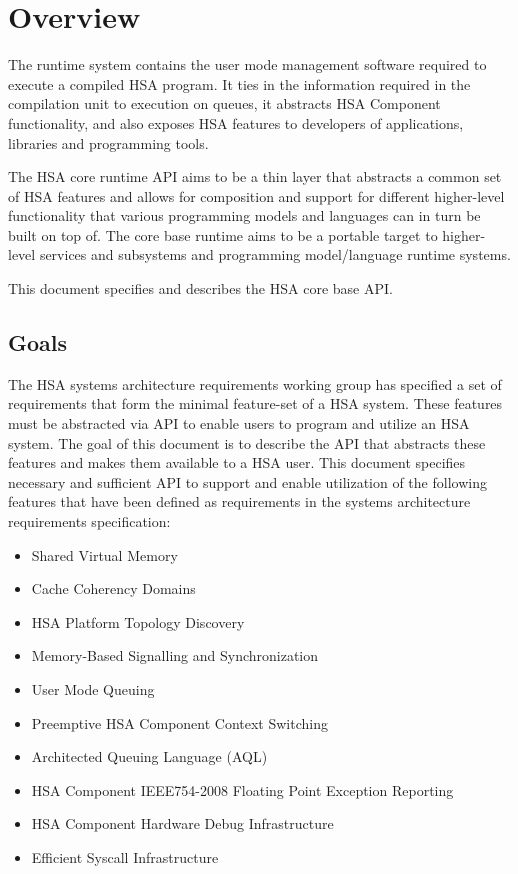 \hypertarget{index_overview}{}\section{Overview}\label{index_overview}

The runtime system contains the user mode management software
required to execute a compiled HSA program. It ties in the
information required in the compilation unit to execution 
on queues, it abstracts HSA Component functionality, and also
exposes HSA features to developers of applications, libraries and
programming tools.

The H\-S\-A core runtime A\-P\-I aims to be a thin layer
that abstracts a common set of H\-S\-A features and allows for
composition and support for different higher-\/level functionality
that various programming models and languages can in turn be built
on top of. The core base runtime aims to be a portable target to
higher-\/level services and subsystems and programming
model/language runtime systems.

This document specifies and describes the HSA core base A\-P\-I. 

\hypertarget{goals}{}\subsection{Goals}\label{goals}
The HSA systems architecture requirements working group has
specified a set of requirements that form the minimal feature-set of
a HSA system. These features must be abstracted via API to enable
users to program and utilize an HSA system. The goal of this
document is to describe the API that abstracts these features and
makes them available to a HSA user. This document specifies necessary
and sufficient API to support and enable utilization of the following
features that have been defined as requirements in the systems architecture requirements specification:

\begin{itemize}
\item Shared Virtual Memory
\item Cache Coherency Domains 
\item HSA Platform Topology Discovery
\item Memory-Based Signalling and Synchronization 
\item User Mode Queuing  
\item Preemptive HSA Component Context Switching 
\item Architected Queuing Language (AQL)
\item HSA Component IEEE754-2008 Floating Point Exception Reporting
\item HSA Component Hardware Debug Infrastructure 
\item Efficient Syscall Infrastructure
\end{itemize}

